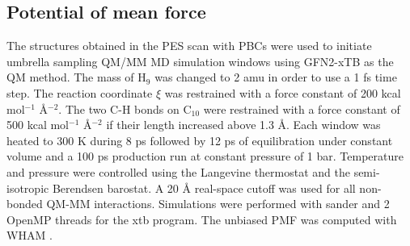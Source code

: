 \subsection{Potential of mean force}
The structures obtained in the PES scan with PBCs were used to initiate umbrella sampling QM/MM MD simulation windows using GFN2-xTB as the QM method. The mass of H$_{9}$ was changed to 2 amu in order to use a 1 fs time step. The reaction coordinate $\xi$ was restrained with a force constant of 200 kcal mol$^{-1}$ Å$^{-2}$. The two C-H bonds on C$_{10}$ were restrained with a force constant of 500 kcal mol$^{-1}$ Å$^{-2}$ if their length increased above 1.3 Å. Each window was heated to 300 K during 8 ps followed by 12 ps of equilibration under constant volume and a 100 ps production run at constant pressure of 1 bar. Temperature and pressure were controlled using the Langevine thermostat and the semi-isotropic Berendsen barostat. A 20 Å real-space cutoff was used for all non-bonded QM-MM interactions. Simulations were performed with sander and 2 OpenMP threads for the xtb program. The unbiased PMF was computed with WHAM \cite{Kumar1992}.
